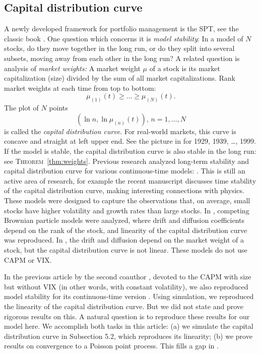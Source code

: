 \documentclass[12pt]{amsart}
\begin{document}
\subsection{Capital distribution curve} A newly developed framework for portfolio management is the SPT, see the classic book \cite{FernholzBook}. One question which concerns it is {\it model stability}: In a model of $N$ stocks, do they move together in the long run, or do they split into several subsets, moving away from each other in the long run? A related question is analysis of {\it market weights:} A market weight $\mu$ of a stock is its market capitalization (size) divided by the sum of all market capitalizations. Rank market weights at each time from top to bottom: 
$$
\mu_{(1)}(t) \ge \ldots \ge \mu_{(N)}(t).
$$
The plot of $N$ points
$$
(\ln n, \ln\mu_{(n)}(t)),\, n = 1, \ldots, N
$$
is called the {\it capital distribution curve}. For real-world markets, this curve is concave and straight at left upper end. See the picture in \cite[Chapter 4]{FernholzBook} for 1929, 1939, \ldots, 1999. If the model is stable, the capital distribution curve is also stable in the long run: see \textsc{Theorem}~\ref{thm:weights}. Previous research analyzed long-term stability and capital distribution curve for various continuous-time models: \cite{Chatterjee, Pal}. This is still an active area of research, for example the recent manuscript \cite{Baker} discusses time stability of the capital distribution curve, making interesting connections with physics. These models were designed to capture the observations that, on average, small stocks have higher volatility and growth rates than large stocks. In \cite{Chatterjee}, competing Brownian particle models were analyzed, where drift and diffusion coefficients depend on the rank of the stock, and linearity of the capital distribution curve was reproduced. In \cite{Pal}, the drift and diffusion depend on the market weight of a stock, but the capital distribution curve is not linear. These models do not use CAPM or VIX. 

In the previous article by the second coauthor \cite{CAPM-size}, devoted to the CAPM with size but without VIX (in other words, with constant volatility), we also reproduced model stability for its continuous-time version \cite[Theorem 2]{CAPM-size}. Using simulation, we reproduced the linearity of the capital distribution curve. But we did not state and prove rigorous results on this. A natural question is to reproduce these results for our model here. We accomplish both tasks in this article: (a) we simulate the capital distribution curve in Subsection 5.2, which reproduces its linearity; (b) we prove results on convergence to a Poisson point process. This fills a gap in \cite{CAPM-size}. 
\end{document}
